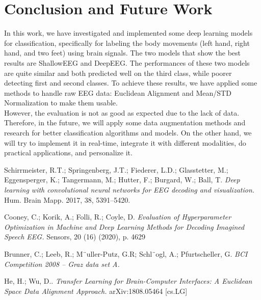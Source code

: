 \documentclass[]{report}
\begin{document}
\section{Conclusion and Future Work}
In this work, we have investigated and implemented some deep learning models for classification, specifically for labeling the body movements (left hand, right hand, and two feet) using brain signals. The two models that show the best results are ShallowEEG and DeepEEG. The performances of these two models are quite similar and both predicted well on the third class, while poorer detecting first and second classes. To achieve these results, we have applied some methods to handle raw EEG data: Euclidean Alignment and Mean/STD Normalization to make them usable.\\
However, the evaluation is not as good as expected due to the lack of data. Therefore, in the future, we will apply some data augmentation methods and research for better classification algorithms and models. On the other hand, we will try to implement it in real-time, integrate it with different modalities, do practical applications, and personalize it.

\begin{thebibliography}{5} 

Schirrmeister, R.T.; Springenberg, J.T.; Fiederer, L.D.; Glasstetter, M.; Eggensperger, K.; Tangermann, M.; Hutter, F.; Burgard, W.; Ball, T.
\textit{Deep learning with convolutional neural networks for EEG decoding and visualization.}
Hum. Brain Mapp. 2017, 38, 5391–5420.

Cooney, C.; Korik, A.; Folli, R.; Coyle, D.
\textit{Evaluation of Hyperparameter Optimization in Machine and Deep Learning Methods for Decoding Imagined Speech EEG.}
Sensors, 20 (16) (2020), p. 4629

Brunner, C.; Leeb, R.; M¨uller-Putz, G.R; Schl¨ogl, A.; Pfurtscheller, G.
\textit{BCI Competition 2008 – Graz data set A.}

He, H.; Wu, D..
\textit{Transfer Learning for Brain-Computer Interfaces: A Euclidean Space Data Alignment Approach.}
arXiv:1808.05464 [cs.LG]
\end{thebibliography}
\end{document}
